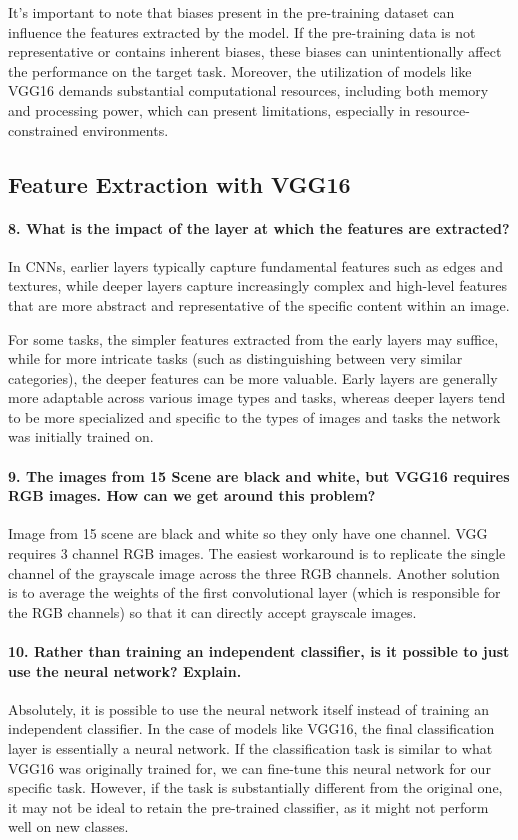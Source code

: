 It's important to note that biases present in the pre-training dataset can influence the features extracted by the model. If the pre-training data is not representative or contains inherent biases, these biases can unintentionally affect the performance on the target task. Moreover, the utilization of models like VGG16 demands substantial computational resources, including both memory and processing power, which can present limitations, especially in resource-constrained environments.

\subsection{Feature Extraction with VGG16}
\paragraph{8. What is the impact of the layer at which the features are extracted?}
In CNNs, earlier layers typically capture fundamental features such as edges and textures, while deeper layers capture increasingly complex and high-level features that are more abstract and representative of the specific content within an image.

For some tasks, the simpler features extracted from the early layers may suffice, while for more intricate tasks (such as distinguishing between very similar categories), the deeper features can be more valuable. Early layers are generally more adaptable across various image types and tasks, whereas deeper layers tend to be more specialized and specific to the types of images and tasks the network was initially trained on.

\paragraph{9. The images from 15 Scene are black and white, but VGG16 requires RGB images. How can we get around this problem?}
Image from 15 scene are black and white so they only have one channel. VGG requires 3 channel RGB images. The easiest workaround is to replicate the single channel of the grayscale image across the three RGB channels. Another solution is to average the weights of the first convolutional layer (which is responsible for the RGB channels) so that it can directly accept grayscale images.

\paragraph{10. Rather than training an independent classifier, is it possible to just use the neural network? Explain.}
Absolutely, it is possible to use the neural network itself instead of training an independent classifier. In the case of models like VGG16, the final classification layer is essentially a neural network. If the classification task is similar to what VGG16 was originally trained for, we can fine-tune this neural network for our specific task. However, if the task is substantially different from the original one, it may not be ideal to retain the pre-trained classifier, as it might not perform well on new classes.

